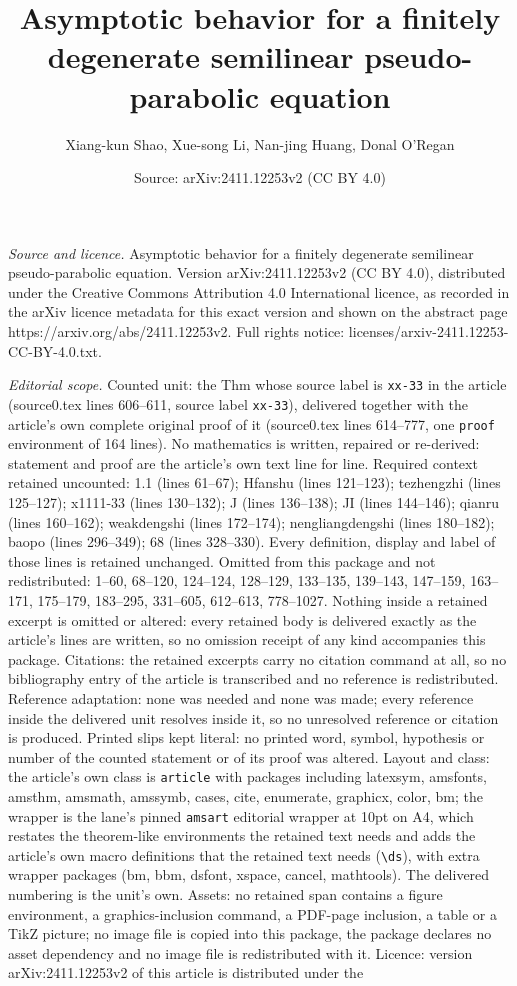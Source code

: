 \documentclass[10pt,a4paper]{amsart}
\title[Asymptotic behavior for a finitely degenerate semilinear pse]{Asymptotic behavior for a finitely degenerate semilinear pseudo-parabolic equation}
\author{Xiang-kun Shao, Xue-song Li, Nan-jing Huang, Donal O'Regan}
\date{Source: arXiv:2411.12253v2 (CC BY 4.0)}
\begin{document}
\maketitle

\noindent\emph{Source and licence.} Asymptotic behavior for a finitely degenerate semilinear pseudo-parabolic equation. Version arXiv:2411.12253v2 (CC BY 4.0), distributed under the Creative Commons Attribution 4.0 International licence, as recorded in the arXiv licence metadata for this exact version and shown on the abstract page https://arxiv.org/abs/2411.12253v2. Full rights notice: licenses/arxiv-2411.12253-CC-BY-4.0.txt.\par\smallskip

\noindent\textit{Editorial scope.} Counted unit: the Thm whose source label is \texttt{xx-33} in the article (source0.tex lines 606--611, source label \texttt{xx-33}), delivered together with the article's own complete original proof of it (source0.tex lines 614--777, one \texttt{proof} environment of 164 lines). No mathematics is written, repaired or re-derived: statement and proof are the article's own text line for line. Required context retained uncounted: 1.1 (lines 61--67); Hfanshu (lines 121--123); tezhengzhi (lines 125--127); x1111-33 (lines 130--132); J (lines 136--138); JI (lines 144--146); qianru (lines 160--162); weakdengshi (lines 172--174); nengliangdengshi (lines 180--182); baopo (lines 296--349); 68 (lines 328--330). Every definition, display and label of those lines is retained unchanged. Omitted from this package and not redistributed: 1--60, 68--120, 124--124, 128--129, 133--135, 139--143, 147--159, 163--171, 175--179, 183--295, 331--605, 612--613, 778--1027. Nothing inside a retained excerpt is omitted or altered: every retained body is delivered exactly as the article's lines are written, so no omission receipt of any kind accompanies this package. Citations: the retained excerpts carry no citation command at all, so no bibliography entry of the article is transcribed and no reference is redistributed. Reference adaptation: none was needed and none was made; every reference inside the delivered unit resolves inside it, so no unresolved reference or citation is produced. Printed slips kept literal: no printed word, symbol, hypothesis or number of the counted statement or of its proof was altered. Layout and class: the article's own class is \texttt{article} with packages including latexsym, amsfonts, amsthm, amsmath, amssymb, cases, cite, enumerate, graphicx, color, bm; the wrapper is the lane's pinned \texttt{amsart} editorial wrapper at 10pt on A4, which restates the theorem-like environments the retained text needs and adds the article's own macro definitions that the retained text needs (\texttt{\textbackslash ds}), with extra wrapper packages (bm, bbm, dsfont, xspace, cancel, mathtools). The delivered numbering is the unit's own. Assets: no retained span contains a figure environment, a graphics-inclusion command, a PDF-page inclusion, a table or a TikZ picture; no image file is copied into this package, the package declares no asset dependency and no image file is redistributed with it. Licence: version arXiv:2411.12253v2 of this article is distributed under the 
\end{document}
